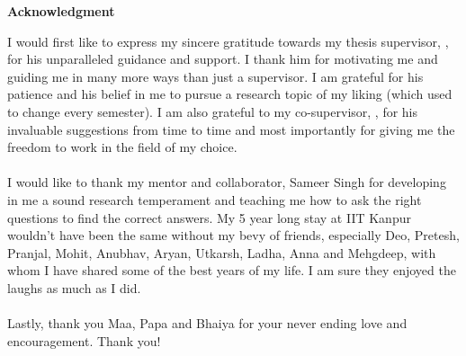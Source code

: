 \begin{center}
	{\huge{\textbf{Acknowledgment}}}
\end{center}
I would first like to express my sincere gratitude towards my thesis supervisor, {\advisormain}, for his unparalleled guidance and support. I thank him for motivating me and guiding me in many more ways than just a supervisor. I am grateful for his patience and his belief in me to pursue a research topic of my liking (which used to change every semester). I am also grateful to my co-supervisor, {\advisorsec}, for his invaluable suggestions from time to time and most importantly for giving me the freedom to work in the field of my choice.

\paragraph*{}
I would like to thank my mentor and collaborator, Sameer Singh for developing in me a sound research temperament and teaching me how to ask the right questions to find the correct answers. 
My 5 year long stay at IIT Kanpur wouldn't have been the same without my bevy of friends, especially Deo, Pretesh, Pranjal, Mohit, Anubhav, Aryan, Utkarsh, Ladha, Anna and Mehgdeep, with whom I have shared some of the best years of my life. I am sure they enjoyed the laughs as much as I did.

\paragraph*{}
Lastly, thank you Maa, Papa and Bhaiya for your never ending love and encouragement. Thank you!

\vskip 4mm
\begin{flushright}
\textit{\textbf{\author}}
\end{flushright}




